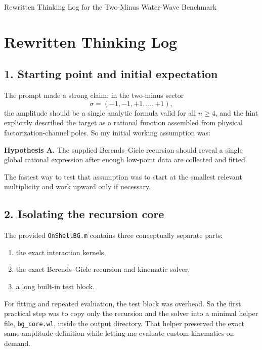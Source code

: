 \documentclass[11pt]{article}
\begin{document}
\begin{center}
{\LARGE Rewritten Thinking Log for the Two-Minus Water-Wave Benchmark}
\end{center}


\section*{Rewritten Thinking Log}

\subsection*{1. Starting point and initial expectation}

The prompt made a strong claim: in the two-minus sector
\[
\sigma = (-1,-1,+1,\ldots,+1),
\]
the amplitude should be a single analytic formula valid for all $n \ge 4$, and
the hint explicitly described the target as a rational function assembled from
physical factorization-channel poles. So my initial working assumption was:

\medskip
\textbf{Hypothesis A.} The supplied Berends--Giele recursion should reveal a
single global rational expression after enough low-point data are collected and
fitted.
\medskip

The fastest way to test that assumption was to start at the smallest relevant
multiplicity and work upward only if necessary.

\subsection*{2. Isolating the recursion core}

The provided \texttt{OnShellBG.m} contains three conceptually separate parts:

\begin{enumerate}
\item the exact interaction kernels,
\item the exact Berends--Giele recursion and kinematic solver,
\item a long built-in test block.
\end{enumerate}

For fitting and repeated evaluation, the test block was overhead. So the first
practical step was to copy only the recursion and the solver into a minimal
helper file, \texttt{bg\_core.wl}, inside the output directory. That helper
preserved the exact same amplitude definition while letting me evaluate custom
kinematics on demand.
\end{document}
